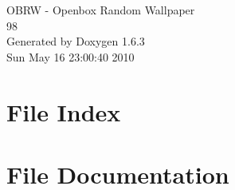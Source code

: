 \documentclass[a4paper]{book}
\begin{document}
\hypersetup{pageanchor=false}
\begin{titlepage}
\vspace*{7cm}
\begin{center}
{\Large OBRW -\/ Openbox Random Wallpaper \\[1ex]\large 98 }\\
\vspace*{1cm}
{\large Generated by Doxygen 1.6.3}\\
\vspace*{0.5cm}
{\small Sun May 16 23:00:40 2010}\\
\end{center}
\end{titlepage}
\clearemptydoublepage
{}
\tableofcontents
\clearemptydoublepage
{}
\hypersetup{pageanchor=true}
\chapter{File Index}

\chapter{File Documentation}
















\printindex
\end{document}

